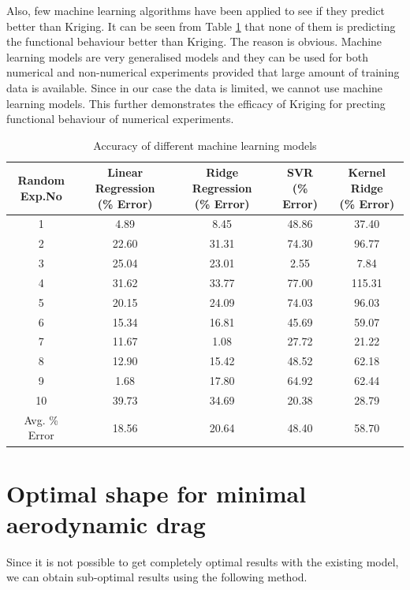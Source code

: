 Also, few machine learning algorithms have been applied to see if they predict better than Kriging. It can be seen from Table \ref{Accuracy of different machine learning models} that none of them is predicting the functional behaviour better than Kriging. The reason is obvious. Machine learning models are very generalised models and they can be used for both numerical and non-numerical experiments provided that large amount of training data is available. Since in our case the data is limited, we cannot use machine learning models. This further demonstrates the efficacy of Kriging for precting functional behaviour of numerical experiments.
\begin{table}[H]
	\caption{Accuracy of different machine learning models}
	\label{Accuracy of different machine learning models}
	\centering
	\begin{tabular}{ccccc}
		\hline \hline
		\specialcell{ Random \\ Exp.No}	& \specialcell{Linear Regression \\ (\% Error)}	&\specialcell{Ridge Regression \\ (\% Error)}	& \specialcell{SVR \\ (\% Error)} & \specialcell{Kernel Ridge \\ (\% Error)} \\
		\hline \hline
		1 &4.89	&8.45	&48.86	&37.40 \\
		2 &22.60	&31.31	&74.30	&96.77 \\
		3 &25.04	&23.01	&2.55	&7.84 \\
		4 &31.62	&33.77	&77.00	&115.31 \\
		5 &20.15	&24.09	&74.03	&96.03 \\
		6 &15.34	&16.81	&45.69	&59.07 \\
		7 &11.67	&1.08	&27.72	&21.22 \\
		8 &12.90	&15.42	&48.52	&62.18 \\
		9 &1.68	&17.80	&64.92	&62.44  \\ 
		10 &39.73	&34.69	&20.38	&28.79 \\
		\hline \hline
		Avg. \% Error	&18.56	&20.64	&48.40	&58.70
		 \\
		\hline \hline
	\end{tabular}
\end{table}


\section{Optimal shape for minimal aerodynamic drag}
Since it is not possible to get completely optimal results with the existing model, we can obtain sub-optimal results using the following method.



